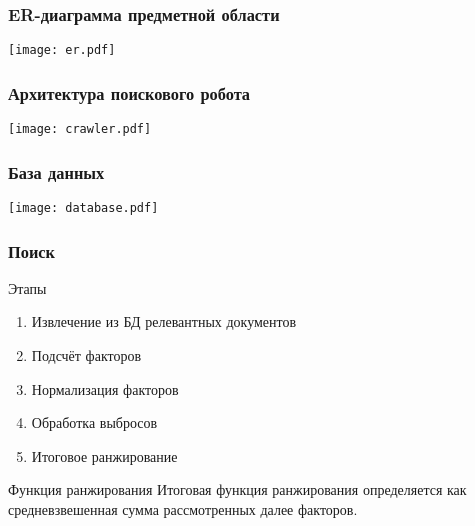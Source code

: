 \documentclass[hyperref={unicode}, 14pt]{beamer}
\begin{document}
\begin{frame}
  \frametitle{ER-диаграмма предметной области}

  \begin{center}
    \texttt{[image: er.pdf]}
  \end{center}
\end{frame}

\begin{frame}
  \frametitle{Архитектура поискового робота}

  \begin{center}
    \texttt{[image: crawler.pdf]}
  \end{center}
\end{frame}

\begin{frame}
  \frametitle{База данных}

  \begin{center}
    \texttt{[image: database.pdf]}
  \end{center}
\end{frame}

\begin{frame}
  \frametitle{Поиск}

  \begin{block}{Этапы}
    \begin{enumerate}
      \item Извлечение из БД релевантных документов
      \item Подсчёт факторов
      \item Нормализация факторов
      \item Обработка выбросов
      \item Итоговое ранжирование
    \end{enumerate}
  \end{block}

  \begin{block}{Функция ранжирования}
    Итоговая функция ранжирования определяется как средневзвешенная сумма рассмотренных далее факторов.
  \end{block}
\end{frame}
\end{document}
